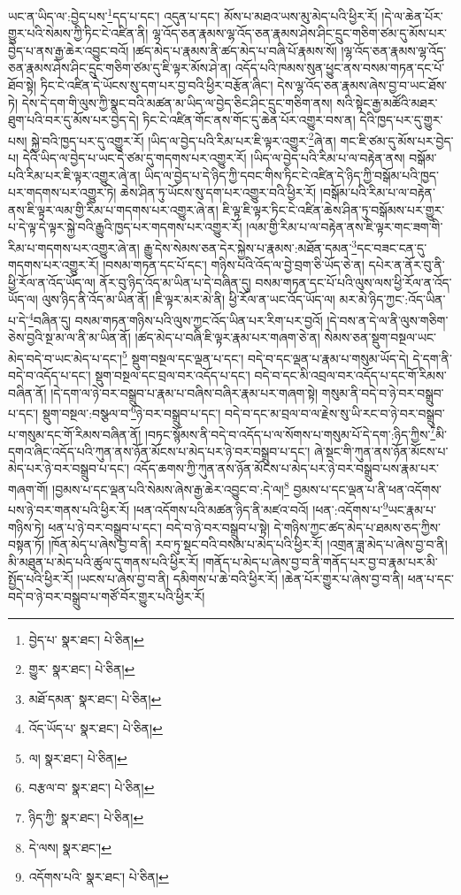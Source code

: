 ཡང་ན་ཡིད་ལ་:བྱེད་པས་\footnote{བྱེད་པ་  སྣར་ཐང་།  པེ་ཅིན། }དད་པ་དང་། འདུན་པ་དང་། མོས་པ་མཐའ་ཡས་མུ་མེད་པའི་ཕྱིར་རོ། །དེ་ལ་ཆེན་པོར་གྱུར་པའི་སེམས་ཀྱི་ཏིང་ངེ་འཛིན་ནི། ལྷ་འོད་ཅན་རྣམས་ལྷ་འོད་ཅན་རྣམས་ཤེས་ཤིང་དྲུང་གཅིག་ཙམ་དུ་མོས་པར་བྱེད་པ་ནས་རྒྱ་ཆེར་འབྱུང་བའོ། །ཚད་མེད་པ་རྣམས་ནི་ཚད་མེད་པ་བཞི་པོ་རྣམས་སོ། །ལྷ་འོད་ཅན་རྣམས་ལྷ་འོད་ཅན་རྣམས་ཤེས་ཤིང་དྲུང་གཅིག་ཙམ་དུ་ཇི་ལྟར་མོས་ཤེ་ན། འདོད་པའི་ཁམས་སུན་ཕྱུང་ནས་བསམ་གཏན་དང་པོ་ཐོབ་སྟེ། ཏིང་ངེ་འཛིན་དེ་ཡོངས་སུ་དག་པར་བྱ་བའི་ཕྱིར་བརྩོན་ཞིང་། དེས་ལྷ་འོད་ཅན་རྣམས་ཞེས་བྱ་བ་ཡང་ཐོས་ཏེ། དེས་དེ་དག་གི་ལུས་ཀྱི་སྣང་བའི་མཚན་མ་ཡིད་ལ་བྱེད་ཅིང་ཤིང་དྲུང་གཅིག་ནས། སའི་སྟེང་རྒྱ་མཚོའི་མཐར་ཐུག་པའི་བར་དུ་མོས་པར་བྱེད་དེ། ཏིང་ངེ་འཛིན་གོང་ནས་གོང་དུ་ཆེན་པོར་འགྱུར་བས་ན། དེའི་ཁྱད་པར་དུ་གྱུར་པས། སྐྱེ་བའི་ཁྱད་པར་དུ་འགྱུར་རོ། །ཡིད་ལ་བྱེད་པའི་རིམ་པར་ཇི་ལྟར་འགྱུར་\footnote{གྱུར་  སྣར་ཐང་།  པེ་ཅིན། }ཞེ་ན། གང་ཇི་ཙམ་དུ་མོས་པར་བྱེད་པ། དེའི་ཡིད་ལ་བྱེད་པ་ཡང་དེ་ཙམ་དུ་གདགས་པར་འགྱུར་རོ། །ཡིད་ལ་བྱེད་པའི་རིམ་པ་ལ་བརྟེན་ནས། བསྒོམ་པའི་རིམ་པར་ཇི་ལྟར་འགྱུར་ཞེ་ན། ཡིད་ལ་བྱེད་པ་དེ་ཉིད་ཀྱི་དབང་གིས་ཏིང་ངེ་འཛིན་དེ་ཉིད་ཀྱི་བསྒོམ་པའི་ཁྱད་པར་གདགས་པར་འགྱུར་ཏེ། ཆེས་ཤིན་ཏུ་ཡོངས་སུ་དག་པར་འགྱུར་བའི་ཕྱིར་རོ། །བསྒོམ་པའི་རིམ་པ་ལ་བརྟེན་ནས་ཇི་ལྟར་ལམ་གྱི་རིམ་པ་གདགས་པར་འགྱུར་ཞེ་ན། ཇི་ལྟ་ཇི་ལྟར་ཏིང་ངེ་འཛིན་ཆེས་ཤིན་ཏུ་བསྒོམས་པར་གྱུར་པ་དེ་ལྟ་དེ་ལྟར་སྐྱེ་བའི་རྒྱུའི་ཁྱད་པར་གདགས་པར་འགྱུར་རོ། །ལམ་གྱི་རིམ་པ་ལ་བརྟེན་ནས་ཇི་ལྟར་གང་ཟག་གི་རིམ་པ་གདགས་པར་འགྱུར་ཞེ་ན། རྒྱུ་དེས་སེམས་ཅན་དེར་སྐྱེས་པ་རྣམས་:མཐོན་དམན་\footnote{མཐོ་དམན་  སྣར་ཐང་།  པེ་ཅིན། }དང་བཟང་ངན་དུ་གདགས་པར་འགྱུར་རོ། །བསམ་གཏན་དང་པོ་དང་། གཉིས་པའི་འོད་ལ་བྱེ་བྲག་ཅི་ཡོད་ཅེ་ན། དཔེར་ན་ནོར་བུ་ནི་ཕྱི་རོལ་ན་འོད་ཡོད་ལ། ནོར་བུ་ཉིད་འོད་མ་ཡིན་པ་དེ་བཞིན་དུ། བསམ་གཏན་དང་པོ་པའི་ལུས་ལས་ཕྱི་རོལ་ན་འོད་ཡོད་ལ། ལུས་ཉིད་ནི་འོད་མ་ཡིན་ནོ། །ཇི་ལྟར་མར་མེ་ནི། ཕྱི་རོལ་ན་ཡང་འོད་ཡོད་ལ། མར་མེ་ཉིད་ཀྱང་:འོད་ཡིན་པ་དེ་\footnote{འོད་ཡོད་པ་  སྣར་ཐང་།  པེ་ཅིན། }བཞིན་དུ། བསམ་གཏན་གཉིས་པའི་ལུས་ཀྱང་འོད་ཡིན་པར་རིག་པར་བྱའོ། །དེ་བས་ན་དེ་ལ་ནི་ལུས་གཅིག་ཅེས་བྱའི་སྔ་མ་ལ་ནི་མ་ཡིན་ནོ། །ཚད་མེད་པ་བཞི་ཇི་ལྟར་རྣམ་པར་གཞག་ཅེ་ན། སེམས་ཅན་སྡུག་བསྔལ་ཡང་མེད་བདེ་བ་ཡང་མེད་པ་དང་།\footnote{ལ།  སྣར་ཐང་།  པེ་ཅིན། } སྡུག་བསྔལ་དང་ལྡན་པ་དང་། བདེ་བ་དང་ལྡན་པ་རྣམ་པ་གསུམ་ཡོད་དེ། དེ་དག་ནི་བདེ་བ་འདོད་པ་དང་། སྡུག་བསྔལ་དང་བྲལ་བར་འདོད་པ་དང་། བདེ་བ་དང་མི་འབྲལ་བར་འདོད་པ་དང་གོ་རིམས་བཞིན་ནོ། །དེ་དག་ལ་ཉེ་བར་བསྒྲུབ་པ་རྣམ་པ་བཞིས་བཞིར་རྣམ་པར་གཞག་སྟེ། གསུམ་ནི་བདེ་བ་ཉེ་བར་བསྒྲུབ་པ་དང་། སྡུག་བསྔལ་:བསྩལ་བ་\footnote{བརྩལ་བ་  སྣར་ཐང་།  པེ་ཅིན། }ཉེ་བར་བསྒྲུབ་པ་དང་། བདེ་བ་དང་མ་བྲལ་བ་ལ་རྗེས་སུ་ཡི་རང་བ་ཉེ་བར་བསྒྲུབ་པ་གསུམ་དང་གོ་རིམས་བཞིན་ནོ། །བཏང་སྙོམས་ནི་བདེ་བ་འདོད་པ་ལ་སོགས་པ་གསུམ་པོ་དེ་དག་:ཉིད་ཀྱིས་\footnote{ཉིད་ཀྱི་  སྣར་ཐང་།  པེ་ཅིན། }མི་དགའ་ཞིང་འདོད་པའི་ཀུན་ནས་ཉོན་མོངས་པ་མེད་པར་ཉེ་བར་བསྒྲུབ་པ་དང་། ཞེ་སྡང་གི་ཀུན་ནས་ཉོན་མོངས་པ་མེད་པར་ཉེ་བར་བསྒྲུབ་པ་དང་། འདོད་ཆགས་ཀྱི་ཀུན་ནས་ཉོན་མོངས་པ་མེད་པར་ཉེ་བར་བསྒྲུབ་པས་རྣམ་པར་གཞག་གོ། །བྱམས་པ་དང་ལྡན་པའི་སེམས་ཞེས་རྒྱ་ཆེར་འབྱུང་བ་:དེ་ལ།\footnote{དེ་ལས།  སྣར་ཐང་། } བྱམས་པ་དང་ལྡན་པ་ནི་ཕན་འདོགས་པས་ཉེ་བར་གནས་པའི་ཕྱིར་རོ། །ཕན་འདོགས་པའི་མཚན་ཉིད་ནི་མཛའ་བའོ། །ཕན་:འདོགས་པ་\footnote{འདོགས་པའི་  སྣར་ཐང་།  པེ་ཅིན། }ཡང་རྣམ་པ་གཉིས་ཏེ། ཕན་པ་ཉེ་བར་བསྒྲུབ་པ་དང་། བདེ་བ་ཉེ་བར་བསྒྲུབ་པ་སྟེ། དེ་གཉིས་ཀྱང་ཚད་མེད་པ་ཐམས་ཅད་ཀྱིས་བསྟན་ཏོ། །ཁོན་མེད་པ་ཞེས་བྱ་བ་ནི། རབ་ཏུ་སྡང་བའི་བསམ་པ་མེད་པའི་ཕྱིར་རོ། །འགྲན་ཟླ་མེད་པ་ཞེས་བྱ་བ་ནི། མི་མཐུན་པ་མེད་པའི་ཚུལ་དུ་གནས་པའི་ཕྱིར་རོ། །གནོད་པ་མེད་པ་ཞེས་བྱ་བ་ནི་གནོད་པར་བྱ་བ་རྣམ་པར་མི་སྤྱོད་པའི་ཕྱིར་རོ། །ཡངས་པ་ཞེས་བྱ་བ་ནི། དམིགས་པ་ཆེ་བའི་ཕྱིར་རོ། །ཆེན་པོར་གྱུར་པ་ཞེས་བྱ་བ་ནི། ཕན་པ་དང་བདེ་བ་ཉེ་བར་བསྒྲུབ་པ་གཙོ་བོར་གྱུར་པའི་ཕྱིར་རོ། 